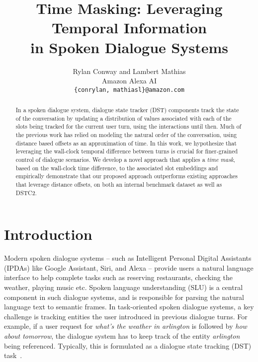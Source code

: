 \documentclass[11pt,a4paper]{article}
\title{Time Masking: Leveraging Temporal Information\\ in Spoken Dialogue Systems}
\author{Rylan Conway and Lambert Mathias\\
Amazon Alexa AI \\
{\tt \{conrylan, mathiasl\}@amazon.com} \\}
\date{}
\begin{document}
\maketitle

\setlength\abovedisplayskip{6pt}
\setlength\belowdisplayskip{6pt}

\begin{abstract}
In a spoken dialogue system, dialogue state tracker (DST) components track the state of the conversation by updating a distribution of values associated with each of the slots being tracked for the current user turn, using the interactions until then.
Much of the previous work has relied on modeling the natural order of the conversation, using distance based offsets as an approximation of time.
In this work, we hypothesize that leveraging the wall-clock temporal difference between turns is crucial for finer-grained control of dialogue scenarios.
We develop a novel approach that applies a {\it time mask}, based on the wall-clock time difference, to the associated slot embeddings and empirically demonstrate that our proposed approach outperforms existing approaches that leverage distance offsets, on both an internal benchmark dataset as well as DSTC2.
 \end{abstract}

\section{Introduction}
\label{sec:intro}
Modern spoken dialogue systems -- such as Intelligent Personal Digital Assistants (IPDAs) like Google Assistant, Siri, and Alexa -- provide users a natural language interface to help complete tasks such as reserving restaurants, checking the weather, playing music etc.
Spoken language understanding (SLU) is a central component in such dialogue systems, and is responsible for parsing the natural language text to semantic frames.
In task-oriented spoken dialogue systems, a key challenge is tracking entities the user introduced in previous dialogue turns.
For example, if a user request for \textit{what's the weather in arlington} is followed by \textit{how about tomorrow}, the dialogue system has to keep track of the entity \textit{arlington} being referenced.
Typically, this is formulated as a dialogue state tracking (DST) task~\citep{henderson2014word, mrkvsic2016neural}.
\end{document}
